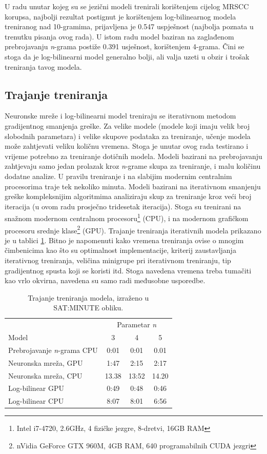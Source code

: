 \documentclass[times, utf8, diplomski, numeric]{fer}
\begin{document}
U radu unutar kojeg su se jezični modeli trenirali korištenjem cijelog MRSCC korupsa, najbolji rezultat postignut je korištenjem log-bilinearnog modela treniranog nad 10-gramima, prijavljena je 0.547 uspješnost (najbolja poznata u trenutku pisanja ovog rada). U istom radu model baziran na zaglađenom prebrojavanju \textit{n}-grama postiže 0.391 usješnost, korištenjem 4-grama. Čini se stoga da je log-bilinearni model generalno bolji, ali valja uzeti u obzir i trošak treniranja tavog modela.

\subsection{Trajanje treniranja}

Neuronske mreže i log-bilinearni model treniraju se iterativnom metodom gradijentnog smanjenja greške. Za velike modele (modele koji imaju velik broj slobodnih parametara) i velike skupove podataka za treniranje, učenje modela može zahtjevati veliku količnu vremena. Stoga je unutar ovog rada testirano i vrijeme potrebno za treniranje dotičnih modela. Modeli bazirani na prebrojavanju zahtjevaju samo jedan prolazak kroz \textit{n}-grame skupa za treniranje, i malu količinu dodatne analize. U pravilu treniranje i na slabijim modernim centralnim procesorima traje tek nekoliko minuta. Modeli bazirani na iterativnom smanjenju greške kompleksnijim algoritmima analiziraju skup za treniranje kroz veći broj iteracija (u ovom radu prosječno tridesetak iteracija). Stoga su trenirani na snažnom modernom centralnom procesoru\footnote{Intel i7-4720, 2.6GHz, 4 fizičke jezgre, 8-dretvi, 16GB RAM} (CPU), i na modernom grafičkom procesoru srednje klase\footnote{nVidia GeForce GTX 960M, 4GB RAM, 640 programabilnih CUDA jezgri} (GPU). Trajanje treniranja iterativnih modela prikazano je u tablici \ref{tbl:eval_time}. Bitno je napomenuti kako vremena treniranja ovise o mnogim čimbenicima kao što su optimalnost implementacije, kriterij zaustavljanja iterativnog treniranja, veličina minigrupe pri iterativnom treniranju, tip gradijentnog spusta koji se koristi itd. Stoga navedena vremena treba tumačiti kao vrlo okvirna, navedena su samo radi međusobne usporedbe.

\begin{table}[htb]
\caption{Trajanje treniranja modela, izraženo u SAT:MINUTE obliku.}
\label{tbl:eval_time}
\centering
\begin{tabular}{lccc}
\toprule
 & \multicolumn{3}{c}{Parametar \textit{n}} \\
\cmidrule(r){2-4}
Model & 3 & 4 & 5 \\
\midrule
Prebrojavanje \textit{n}-grama CPU &  0:01 & 0:01 & 0.01 \\
Neuronska mreža, GPU & 1:47 & 2:15 & 2:17 \\
Neuronska mreža, CPU & 13.38 & 13:52 & 14.20 \\
Log-bilinear GPU & 0:49 & 0:48 & 0:46 \\
Log-bilinear CPU & 8:07 & 8:01 & 6:56 \\
\bottomrule
\end{tabular}
\end{table}
\end{document}
